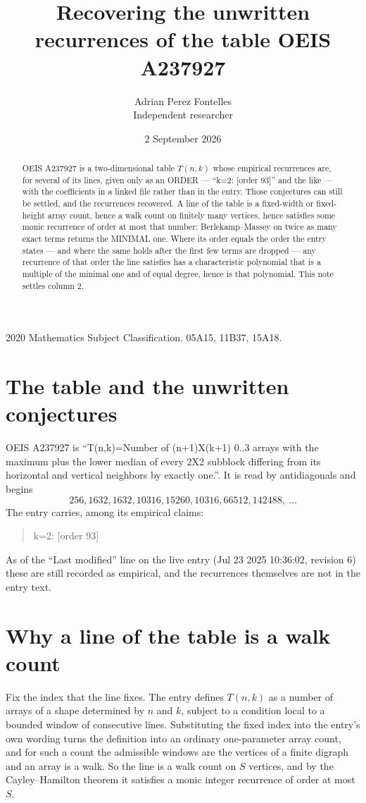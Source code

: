 \documentclass[11pt,a4paper]{article}
\title{Recovering the unwritten recurrences of the table OEIS A237927}
\author{Adrian Perez Fontelles\\ \small Independent researcher}
\date{2 September 2026}
\theoremstyle{plain}
\theoremstyle{definition}
\begin{document}
\maketitle

\begin{abstract}
OEIS A237927 is a two-dimensional table $T(n,k)$ whose empirical recurrences are, for several of
its lines, given only as an ORDER --- ``k=2: [order 93]'' and the like --- with the
coefficients in a linked file rather than in the entry. Those conjectures can still be settled,
and the recurrences recovered. A line of the table is a fixed-width or fixed-height array
count, hence a walk count on finitely many vertices, hence satisfies some monic recurrence of
order at most that number; Berlekamp--Massey on twice as many exact terms returns the MINIMAL
one. Where its order equals the order the entry states --- and where the same holds after the
first few terms are dropped --- any recurrence of that order the line satisfies has a
characteristic polynomial that is a multiple of the minimal one and of equal degree, hence is
that polynomial. This note settles column 2.
\end{abstract}

\noindent\small 2020 Mathematics Subject Classification. 05A15, 11B37, 15A18.\normalsize

\section{The table and the unwritten conjectures}

OEIS A237927 is ``T(n,k)=Number of (n+1)X(k+1) 0..3 arrays with the maximum plus the lower median of every 2X2 subblock differing from its horizontal and vertical neighbors by exactly one.''. It is read by antidiagonals and begins
\[
256, 1632, 1632, 10316, 15260, 10316, 66512, 142488,\ \dots
\]
The entry carries, among its empirical claims:
\begin{quote}\small
k=2: [order 93]
\end{quote}
As of the ``Last modified'' line on the live entry (Jul 23 2025 10:36:02, revision 6) these are still
recorded as empirical, and the recurrences themselves are not in the entry text.

\section{Why a line of the table is a walk count}

Fix the index that the line fixes. The entry defines $T(n,k)$ as a number of arrays of a shape
determined by $n$ and $k$, subject to a condition local to a bounded window of consecutive
lines. Substituting the fixed index into the entry's own wording turns the definition into an
ordinary one-parameter array count, and for such a count the admissible windows are the
vertices of a finite digraph and an array is a walk. So the line is a walk count on $S$
vertices, and by the Cayley--Hamilton theorem it satisfies a monic integer recurrence of order
at most $S$.
\end{document}
